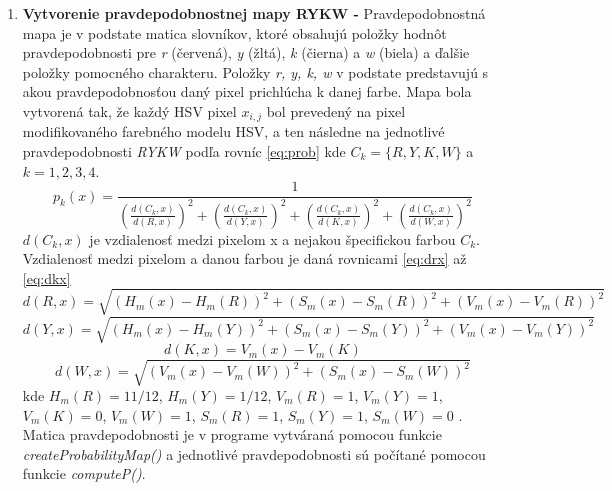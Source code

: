 \begin{enumerate}
    \item \textbf{Vytvorenie pravdepodobnostnej mapy RYKW -} Pravdepodobnostná mapa je v podstate matica slovníkov, ktoré obsahujú položky hodnôt pravdepodobnosti pre \textit{r} (červená), \textit{y} (žltá), \textit{k} (čierna) a \textit{w} (biela) a ďalšie položky pomocného charakteru. Položky \textit{r, y, k, w} v podstate predstavujú s akou pravdepodobnosťou daný pixel prichlúcha k danej farbe. Mapa bola vytvorená tak, že každý HSV pixel $x_{i,j}$ bol prevedený na pixel modifikovaného farebného modelu HSV, a ten následne na jednotlivé pravdepodobnosti \textit{RYKW} podľa rovníc \ref{eq:prob} kde $C_k = \{R, Y, K, W\}$ a $k = 1, 2, 3, 4$.
    \begin{equation}
    \label{eq:prob}
    p_k(x) = \frac{1}{{(\frac{d(C_k, x)}{d(R, x)})}^2 + {(\frac{d(C_k, x)}{d(Y, x)})}^2 + {(\frac{d(C_k, x)}{d(K, x)})}^2 + {(\frac{d(C_k, x)}{d(W, x)})}^2}
    \end{equation}
    $d(C_k, x)$ je vzdialenosť medzi pixelom x a nejakou špecifickou farbou $C_k$. Vzdialenosť medzi pixelom a danou farbou je daná rovnicami \ref{eq:drx} až \ref{eq:dkx}
    \begin{equation}
    \label{eq:drx}
    d(R, x) = \sqrt{{(H_{m}(x) - H_{m}(R))}^2 + {(S_{m}(x) - S_{m}(R))}^2 + {(V_{m}(x) - V_{m}(R))}^2}
    \end{equation}
    \begin{equation}
    \label{eq:dyx}
    d(Y, x) = \sqrt{{(H_{m}(x) - H_{m}(Y))}^2 + {(S_{m}(x) - S_{m}(Y))}^2 + {(V_{m}(x) - V_{m}(Y))}^2}
    \end{equation}
    \begin{equation}
    \label{eq:dkx}
    d(K, x) = V_{m}(x) - V_{m}(K)
    \end{equation}
    \begin{equation}
    \label{eq:dkx}
    d(W, x) = \sqrt{{(V_{m}(x) - V_{m}(W))}^2 + {(S_{m}(x) - S_{m}(W))}^2}
    \end{equation}
    kde $H_{m}(R) = 11/12$, $H_{m}(Y) = 1/12$, $V_{m}(R) = 1$, $V_{m}(Y) = 1$, $V_{m}(K) = 0$, $V_{m}(W) = 1$, $S_{m}(R) = 1$, $S_{m}(Y) = 1$, $S_{m}(W) = 0$ \cite{AHMADFAUZI201574}. Matica pravdepodobnosti je v programe vytváraná pomocou funkcie \textit{createProbabilityMap()} a jednotlivé pravdepodobnosti sú počítané pomocou funkcie \textit{computeP()}. 

\end{enumerate}
